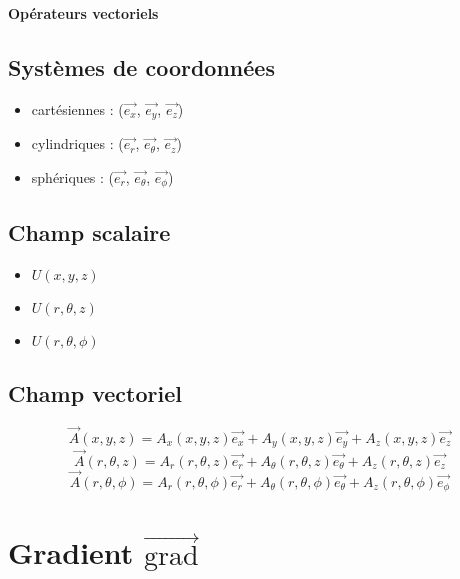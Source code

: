 \documentclass[12pt,a4paper]{article}
\author{Rémi Metzdorff}
\newcommand{\ex}{\overrightarrow{e_x}}
\newcommand{\ey}{\overrightarrow{e_y}}
\newcommand{\ez}{\overrightarrow{e_z}}
\newcommand{\er}{\overrightarrow{e_r}}
\newcommand{\et}{\overrightarrow{e_\theta}}
\newcommand{\ep}{\overrightarrow{e_\phi}}
\newcommand{\grad}{\overrightarrow{\mathrm{grad}}}
\begin{document}
\begin{center}
\Large
\bf
Opérateurs vectoriels
\end{center}

\subsection*{Systèmes de coordonnées}

\begin{itemize}
\item cartésiennes : ($\ex$, $\ey$, $\ez$)
\item cylindriques : ($\er$, $\et$, $\ez$)
\item sphériques : ($\er$, $\et$, $\ep$)
\end{itemize}

\subsection*{Champ scalaire}

\begin{itemize}
\item $U(x,y,z)$
\item $U(r,\theta,z)$
\item $U(r, \theta,\phi)$
\end{itemize}

\subsection*{Champ vectoriel}

\begin{equation*}
\overrightarrow{A}(x,y,z) = A_x(x,y,z)\ex + A_y(x,y,z)\ey + A_z(x,y,z)\ez
\end{equation*}
\begin{equation*}
\overrightarrow{A}(r,\theta,z) = A_r(r,\theta,z)\er + A_\theta(r,\theta,z)\et + A_z(r,\theta,z)\ez
\end{equation*}
\begin{equation*}
\overrightarrow{A}(r,\theta,\phi) = A_r(r,\theta,\phi)\er + A_\theta(r,\theta,\phi)\et + A_z(r,\theta,\phi)\ep
\end{equation*}

\section*{Gradient $\grad$}
\end{document}
